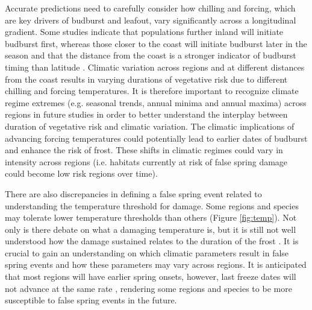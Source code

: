 \documentclass{article}\usepackage[]{graphicx}\usepackage[]{color}
\begin{document}
Accurate predictions need to carefully consider how chilling and forcing, which are key drivers of budburst and leafout, vary significantly across a longitudinal gradient. Some studies indicate that populations further inland will initiate budburst first, whereas those closer to the coast will initiate budburst later in the season and that the distance from the coast is a stronger indicator of budburst timing than latitude \citep{Myking2007}. Climatic variation across regions and at different distances from the coast results in varying durations of vegetative risk due to different chilling and forcing temperatures. It is therefore important to recognize climate regime extremes (e.g. seasonal trends, annual minima and annual maxima) across regions in future studies in order to better understand the interplay between duration of vegetative risk and climatic variation. The climatic implications of advancing forcing temperatures could potentially lead to earlier dates of budburst and enhance the risk of frost. These shifts in climatic regimes could vary in intensity across regions (i.e. habitats currently at risk of false spring damage could become low risk regions over time). 

There are also discrepancies in defining a false spring event related to understanding the temperature threshold for damage. Some regions and species may tolerate lower temperature thresholds than others (Figure \ref{fig:temp}). Not only is there debate on what a damaging temperature is, but it is still not well understood how the damage sustained relates to the duration of the frost \citep{Sakai1987, Augspurger2009, Vitasse2014, Vitra2017}. It is crucial to gain an understanding on which climatic parameters result in false spring events and how these parameters may vary across regions. It is anticipated that most regions will have earlier spring onsets, however, last freeze dates will not advance at the same rate \citep{Inouye2008,Martin2010,Labe2016,Sgubin2018}, rendering some regions and species to be more susceptible to false spring events in the future. 
\end{document}
